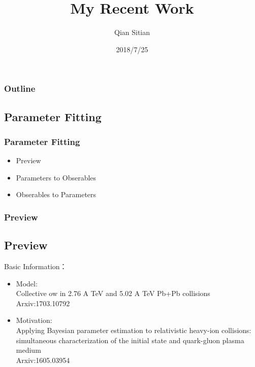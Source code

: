 \documentclass{beamer}
\title{My Recent Work}
\author{Qian Sitian}
\date{2018/7/25}
\begin{document}
\maketitle
\begin{frame}
    \titlepage
\end{frame}
\begin{frame}
    \frametitle{Outline}
    \tableofcontents
\end{frame}
\begin{frame}   
    \section{Parameter Fitting}
    \frametitle{Parameter Fitting}
    \begin{itemize}
        \item Preview
        \item Parameters to Obserables
        \item Obserables to Parameters
    \end{itemize}
\end{frame}
\begin{frame}
    \frametitle{Preview}
    \subsection{Preview}
    Basic Information：
    \begin{itemize}
        \item Model:\\Collective 
        ow in 2.76 A TeV and 5.02 A TeV Pb+Pb
        collisions
        \\
        Arxiv:1703.10792
        \item Motivation:\\Applying Bayesian parameter estimation to relativistic heavy-ion collisions:
        simultaneous characterization of the initial state and quark-gluon plasma medium
        \\
        Arxiv:1605.03954
    \end{itemize}
\end{frame}
\end{document}
